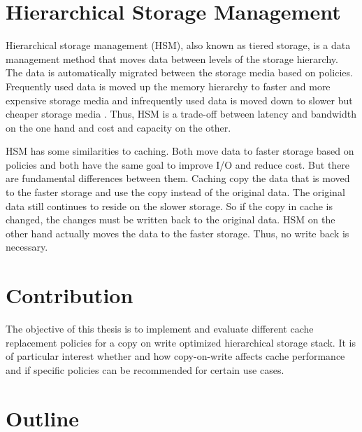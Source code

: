 \documentclass[
	12pt,
	a4paper,
	abstract,
	bibliography=totoc,
	chapterprefix,
	headings=openright,
	numbers=endperiod,
	parskip=half,
	twoside,
]{scrreprt}
\begin{document}


\section{Hierarchical Storage Management}


Hierarchical storage management (HSM), also known as tiered storage, is a data management method that moves data between levels of the storage hierarchy.
The data is automatically migrated between the storage media based on policies.
Frequently used data is moved up the memory hierarchy to faster and more expensive 
storage media and infrequently used data is moved down to slower but cheaper storage media
 \cite{lugar2001hierarchical}.
Thus, HSM is a trade-off between latency and bandwidth on the one hand 
and cost and capacity on the other.

HSM has some similarities to caching.
Both move data to faster storage based on policies and both have the same goal to improve I/O 
and reduce cost.
But there are fundamental differences between them.
Caching copy the data that is moved to the faster storage and use the copy instead of the original data. 
The original data still continues to reside on the slower storage.
So if the copy in cache is changed, the changes must be written back to the original data.
HSM on the other hand actually moves the data to the faster storage.
Thus, no write back is necessary.

\section{Contribution}

The objective of this thesis is to implement and evaluate different cache replacement policies 
for a copy on write optimized hierarchical storage stack.
It is of particular interest whether and how copy-on-write affects cache performance and 
if specific policies can be recommended for certain use cases.

\section{Outline}
\end{document}
